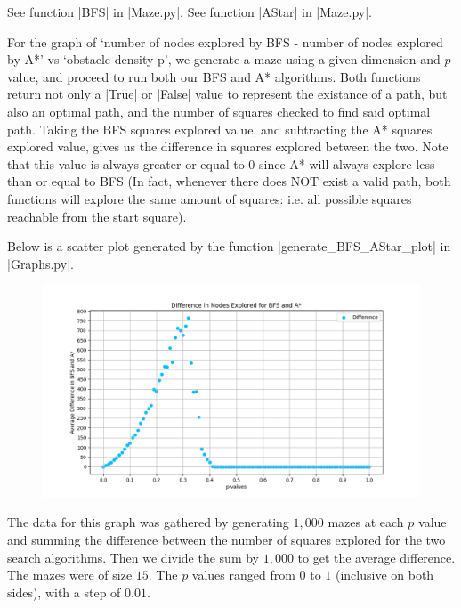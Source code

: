 \documentclass[12pt, twoside]{article}
\begin{document}
\begin{enumerate}
        \vspace{4mm}
        See function \cverb|BFS| in \cverb|Maze.py|. See function \cverb|AStar| in \cverb|Maze.py|.

        \vspace{4mm}
        For the graph of `number of nodes explored by BFS - number of nodes explored by A*' vs `obstacle density p', we generate a maze using a given dimension and $p$ value, and proceed to run both our BFS and A* algorithms. Both functions return not only a \cverb|True| or \cverb|False| value to represent the existance of a path, but also an optimal path, and the number of squares checked to find said optimal path. Taking the BFS squares explored value, and subtracting the A* squares explored value, gives us the difference in squares explored between the two. Note that this value is always greater or equal to 0 since A* will always explore less than or equal to BFS (In fact, whenever there does NOT exist a valid path, both functions will explore the same amount of squares: i.e. all possible squares reachable from the start square).  

        Below is a scatter plot generated by the function \cverb|generate_BFS_AStar_plot| in \\ \cverb|Graphs.py|.

        \begin{figure}[h]
            \centering
            \includegraphics[scale = 0.6]{BFS_AStar_scatter.png}
        \end{figure}

        The data for this graph was gathered by generating $1,000$ mazes at each $p$ value and summing the difference between the number of squares explored for the two search algorithms. Then we divide the sum by $1,000$ to get the average difference. The mazes were of size $15$. The $p$ values ranged from $0$ to $1$ (inclusive on both sides), with a step of $0.01$. 
    

\end{enumerate}
\end{document}
